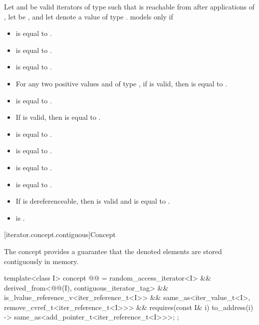 \pnum
Let  and  be valid iterators of type 
such that  is reachable from 
after  applications of ,
let  be ,
and let  denote a value of type .
 models  only if
\begin{itemize}
\item {} is equal to .
\item {} is equal to .
\item {} is equal to .
\item For any two positive values
   and  of type ,
  if  is valid, then
   is equal to .
\item {} is equal to .
\item If  is valid, then
   is equal to .
\item {} is equal to .
\item {} is equal to .
\item {} is equal to .
\item {} is equal to .
\item If  is dereferenceable, then
   is valid and is equal to .
\item {} is .
\end{itemize}

[iterator.concept.contiguous]{Concept }

\pnum
The  concept provides a guarantee that
the denoted elements are stored contiguously in memory.

\begin{codeblock}
template<class I>
  concept @@ =
    random_access_iterator<I> &&
    derived_from<@@(I), contiguous_iterator_tag> &&
    is_lvalue_reference_v<iter_reference_t<I>> &&
    same_as<iter_value_t<I>, remove_cvref_t<iter_reference_t<I>>> &&
    requires(const I& i) {
      { to_address(i) } -> same_as<add_pointer_t<iter_reference_t<I>>>;
    };
\end{codeblock}

